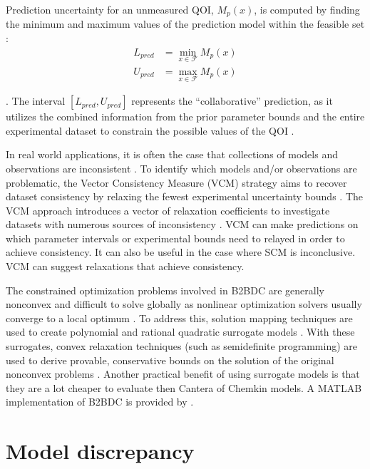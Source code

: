 Prediction uncertainty for an unmeasured QOI, $M_p(x)$, is computed by finding the minimum and maximum values of the prediction model within the feasible set \cite{li_development_nodate}:
\begin{align}
	L_{pred} &= \min_{x \in \mathcal{F}} M_p(x) \\
	U_{pred} &= \max_{x \in \mathcal{F}} M_p(x)
\end{align}

\cite{li_development_nodate}. The interval $[L_{pred}, U_{pred}]$ represents the ``collaborative'' prediction, as it utilizes the combined information from the prior parameter bounds and the entire experimental dataset to constrain the possible values of the QOI \cite{russi_uncertainty_2010, li_development_nodate}.

In real world applications, it is often the case that collections of models and observations are inconsistent \cite{hegde_consistency_2018}. To identify which models and/or observations are problematic, the Vector Consistency Measure (VCM) strategy aims to recover dataset consistency by relaxing the fewest experimental uncertainty bounds \cite{li_development_nodate}. The VCM approach introduces a vector of relaxation coefficients to investigate datasets with numerous sources of inconsistency \cite{hegde_consistency_2018}. VCM can make predictions on which parameter intervals or experimental bounds need to relayed in order to achieve consistency. It can also be useful in the case where SCM is inconclusive. VCM can suggest relaxations that achieve consistency.  

The constrained optimization problems involved in B2BDC are generally nonconvex and difficult to solve globally as nonlinear optimization solvers usually converge to a local optimum \cite{li_development_nodate}. To address this, solution mapping techniques are used to create polynomial and rational quadratic surrogate models \cite{li_development_nodate}. With these surrogates, convex relaxation techniques (such as semidefinite programming) are used to derive provable, conservative bounds on the solution of the original nonconvex problems \cite{li_development_nodate, russi_uncertainty_2010}. Another practical benefit of using surrogate models is that they are a lot cheaper to evaluate then Cantera of Chemkin models. A MATLAB implementation of B2BDC is provided by \cite{li_development_nodate}.


\section{Model discrepancy}

